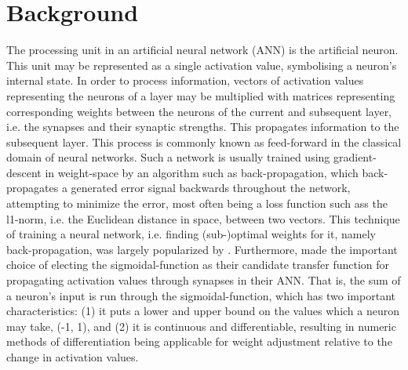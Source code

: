 
\chapter{Background}\label{chpt:background}

The processing unit in an artificial neural network (ANN) is the artificial neuron. This unit may be represented as a single activation value, symbolising a neuron's internal state. In order to process information, vectors of activation values representing the neurons of a layer may be multiplied with matrices representing corresponding weights between the neurons of the current and subsequent layer, i.e. the synapses and their synaptic strengths. This propagates information to the subsequent layer. This process is commonly known as feed-forward in the classical domain of neural networks. Such a network is usually trained using gradient-descent in weight-space by an algorithm such as back-propagation, which back-propagates a generated error signal backwards throughout the network, attempting to minimize the error, most often being a loss function such ass the l1-norm, i.e. the Euclidean distance in space, between two vectors. This technique of training a neural network, i.e. finding (sub-)optimal weights for it, namely back-propagation, was largely popularized by \cite{Rumelhart1986}. Furthermore, \cite{Rumelhart1986} made the important choice of electing the sigmoidal-function as their candidate transfer function for propagating activation values through synapses in their ANN. That is, the sum of a neuron's input is run through the sigmoidal-function, which has two important characteristics: (1) it puts a lower and upper bound on the values which a neuron may take, (-1, 1), and (2) it is continuous and differentiable, resulting in numeric methods of differentiation being applicable for weight adjustment relative to the change in activation values.

